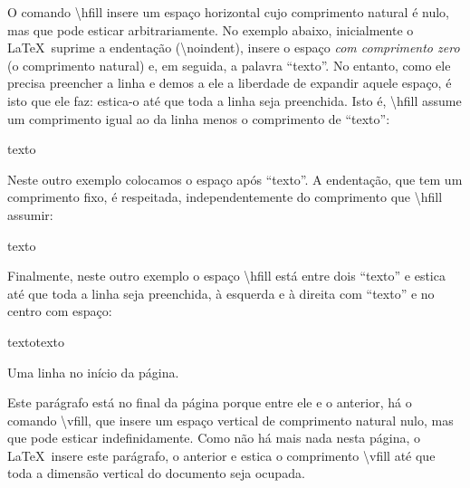 \documentclass[a4paper,12pt]{article}
\newcommand{\comando}[1]{{\textbackslash\color{blue!70}\normalfont #1}}
\begin{document}
	O comando \comando{hfill} insere um espaço horizontal cujo comprimento natural é nulo, mas que pode esticar arbitrariamente. No exemplo abaixo, inicialmente o \LaTeX\ suprime a endentação (\comando{noindent}), insere o espaço \emph{com comprimento zero} (o comprimento natural) e, em seguida, a palavra ``texto''. No entanto, como ele precisa preencher a linha e demos a ele a liberdade de expandir aquele espaço, é isto que ele faz: estica-o até que toda a linha seja preenchida. Isto é, \comando{hfill} assume um comprimento igual ao da linha menos o comprimento de ``texto'':

	\noindent \hfill texto\par
	
	Neste outro exemplo colocamos o espaço após ``texto''. A endentação, que tem um comprimento fixo, é respeitada, independentemente do comprimento que \comando{hfill} assumir:
	
	texto\hfill
	
	Finalmente, neste outro exemplo o espaço \comando{hfill} está entre dois ``texto'' e estica até que toda a linha seja preenchida, à esquerda e à direita com ``texto'' e no centro com espaço:
	
	\noindent texto\hfill texto\par
	
	
	\newpage
		
	Uma linha no início da página.
				
	\vfill
			
	Este parágrafo está no final da página porque entre ele e o anterior, há o comando \comando{vfill}, que insere um espaço vertical de comprimento natural nulo, mas que pode esticar indefinidamente. Como não há mais nada nesta página, o \LaTeX\ insere este parágrafo, o anterior e estica o comprimento \comando{vfill} até que toda a dimensão vertical do documento seja ocupada.
					
\end{document}
